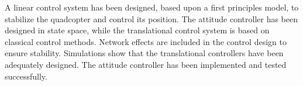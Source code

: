 A linear control system has been designed, based upon a first principles model, to stabilize the quadcopter and control its position. The attitude controller has been designed in state space, while the translational control system is based on classical control methods. Network effects are included in the control design to ensure stability. Simulations show that the translational controllers have been adequately designed. The attitude controller has been implemented and tested successfully.
